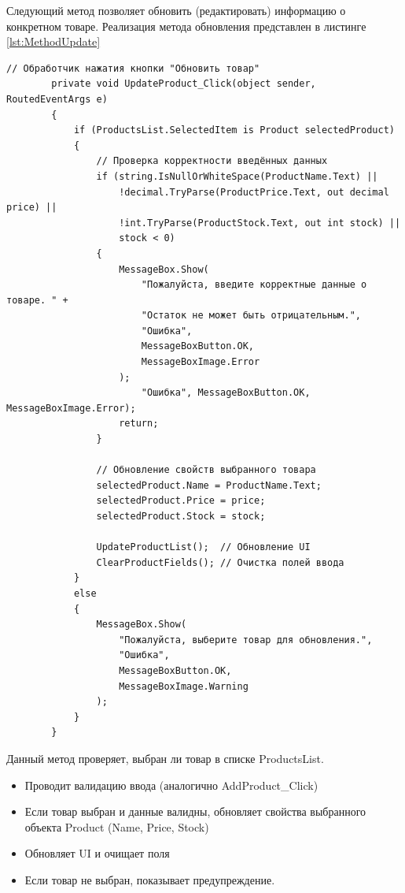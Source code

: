 \documentclass[12pt]{article}
\newcommand{\colorGIT}[1]{\textcolor{CtpGreen}{#1}}
\begin{document}
\newpage

Следующий метод позволяет обновить (редактировать) информацию о конкретном товаре. Реализация метода обновления представлен в листинге \ref{lst:MethodUpdate}

\begin{lstlisting}[style=csharp_catppuccin, caption=\colorGIT{\href{https://github.com/WebMasterIT/Csharp_Labs/blob/ec375afd16c0647b337cf3d8a79c8bef904fc1be/3lab/StoreManager/MainWindow.xaml.cs\#L82-L110}{Метод}} обновления нового товара, label=lst:MethodUpdate]
        // Обработчик нажатия кнопки "Обновить товар"
        private void UpdateProduct_Click(object sender, RoutedEventArgs e)
        {
            if (ProductsList.SelectedItem is Product selectedProduct)
            {
                // Проверка корректности введённых данных
                if (string.IsNullOrWhiteSpace(ProductName.Text) ||
                    !decimal.TryParse(ProductPrice.Text, out decimal price) ||
                    !int.TryParse(ProductStock.Text, out int stock) ||
                    stock < 0)
                {
                    MessageBox.Show(
                        "Пожалуйста, введите корректные данные о товаре. " +
                        "Остаток не может быть отрицательным.",
                        "Ошибка",
                        MessageBoxButton.OK,
                        MessageBoxImage.Error
                    );
                        "Ошибка", MessageBoxButton.OK, MessageBoxImage.Error);
                    return;
                }

                // Обновление свойств выбранного товара
                selectedProduct.Name = ProductName.Text;
                selectedProduct.Price = price;
                selectedProduct.Stock = stock;

                UpdateProductList();  // Обновление UI
                ClearProductFields(); // Очистка полей ввода
            }
            else
            {
                MessageBox.Show(
                    "Пожалуйста, выберите товар для обновления.",
                    "Ошибка",
                    MessageBoxButton.OK,
                    MessageBoxImage.Warning
                );
            }
        }
\end{lstlisting}


\noindent Данный метод проверяет, выбран ли товар в списке ProductsList.
\begin{itemize}
	\item Проводит валидацию ввода (аналогично AddProduct\_Click)
	\item Если товар выбран и данные валидны, обновляет свойства выбранного объекта Product (Name, Price, Stock)
	\item Обновляет UI и очищает поля
	\item Если товар не выбран, показывает предупреждение.
\end{itemize}
\end{document}
